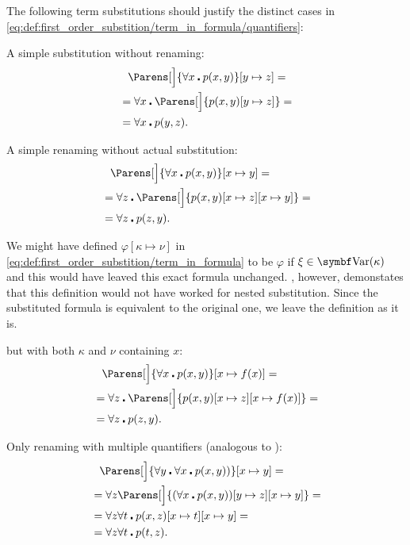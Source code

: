 \begin{example}\label{ex:first_order_substition}
  The following term substitutions should justify the distinct cases in \eqref{eq:def:first_order_substition/term_in_formula/quantifiers}:
  \begin{ExEnum}
     A simple substitution without renaming:
    \begin{align*}
      &{}\phantom{=}{}
      \Parens[\Big]{\forall x \centerdot p(x, y)}[y \mapsto z]
      = \\ &=
      \forall x \centerdot \Parens[\Big]{p(x, y)[y \mapsto z]}
      = \\ &=
      \forall x \centerdot p(y, z).
    \end{align*}

     A simple renaming without actual substitution:
    \begin{align*}
      &{}\phantom{=}{}
      \Parens[\Big]{\forall x \centerdot p(x, y)}[x \mapsto y]
      = \\ &=
      \forall z \centerdot \Parens[\Big]{p(x, y)[x \mapsto z][x \mapsto y]}
      = \\ &=
      \forall z \centerdot p(z, y).
    \end{align*}

    We might have defined \( \varphi[\kappa \mapsto \nu] \) in \eqref{eq:def:first_order_substition/term_in_formula} to be \( \varphi \) if \( \xi \in \Bold{Var}(\kappa) \) and this would have leaved this exact formula unchanged. , however, demonstates that this definition would not have worked for nested substitution. Since the substituted formula is equivalent to the original one, we leave the definition as it is.

      but with both \( \kappa \) and \( \nu \) containing \( x \):
    \begin{align*}
      &{}\phantom{=}{}
      \Parens[\Big]{\forall x \centerdot p(x, y)}[x \mapsto f(x)]
      = \\ &=
      \forall z \centerdot \Parens[\Big]{p(x, y)[x \mapsto z][x \mapsto f(x)]}
      = \\ &=
      \forall z \centerdot p(z, y).
    \end{align*}

     Only renaming with multiple quantifiers (analogous to ):
    \begin{align*}
      &{}\phantom{=}{}
      \Parens[\Big]{\forall y \centerdot \forall x \centerdot p(x, y))}[x \mapsto y]
      = \\ &=
      \forall z \Parens[\Big]{(\forall x \centerdot p(x, y))[y \mapsto z][x \mapsto y]}
      = \\ &=
      \forall z \forall t \centerdot p(x, z)[x \mapsto t][x \mapsto y]
      = \\ &=
      \forall z \forall t \centerdot p(t, z).
    \end{align*}


\end{ExEnum}
\end{example}
